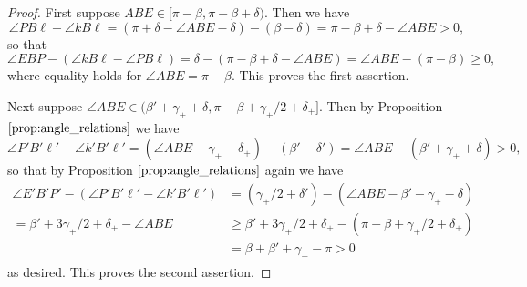 \documentclass[11pt]{amsart}
\numberwithin{equation}{section}
\numberwithin{theorem}{section}
\begin{document}
\begin{proof}
First suppose $ABE\in [\pi -\beta ,\pi -\beta +\delta )$.
Then we have
\begin{equation*}
\angle PB\ell -\angle kB\ell =(\pi +\delta -\angle ABE-\delta )-(\beta -\delta )=\pi -\beta +\delta -\angle ABE>0,
\end{equation*}
so that
\begin{equation*}
\angle EBP -(\angle kB\ell -\angle PB\ell )=\delta -(\pi -\beta+\delta -\angle ABE)=\angle ABE -(\pi -\beta )\geqslant 0,
\end{equation*}
where equality holds for $\angle ABE=\pi -\beta$.
This proves the first assertion.

Next suppose $\angle ABE\in (\beta'+\gamma_++\delta ,\pi -\beta +\gamma_+/2+\delta_+]$.
Then by Proposition $\ref{prop:angle_relations}$ we have
\begin{equation*}
\angle P'B'\ell' -\angle k'B'\ell'=(\angle ABE-\gamma_+-\delta_+)-(\beta'-\delta')=\angle ABE-(\beta'+\gamma_++\delta )>0,
\end{equation*}
so that by Proposition $\ref{prop:angle_relations}$ again we have
\begin{align*}
\angle E'B'P' -(\angle P'B'\ell' -\angle k'B'\ell')&=(\gamma_+/2+\delta')-(\angle ABE-\beta'-\gamma_+-\delta )\\
=\beta'+3\gamma_+/2+\delta_+-\angle ABE&\geqslant\beta'+3\gamma_+/2+\delta_+-(\pi -\beta +\gamma_+/2+\delta_+)\\
&=\beta +\beta'+\gamma_+-\pi >0
\end{align*}
as desired.
This proves the second assertion.
\end{proof}
\end{document}

